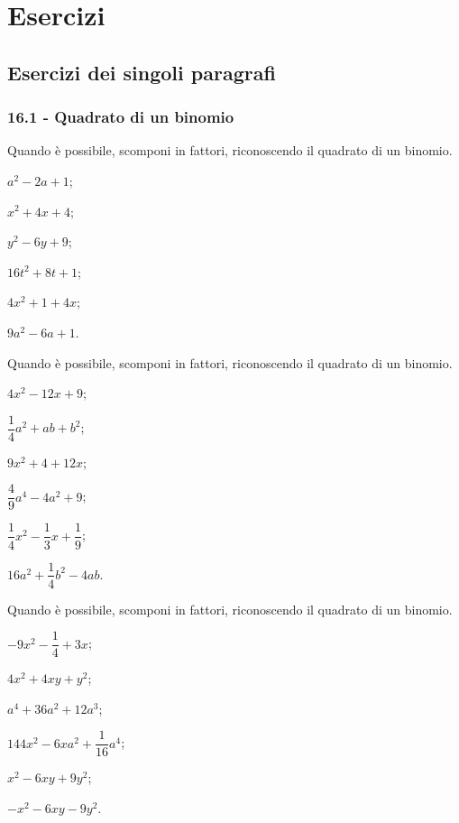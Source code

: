 \section{Esercizi}
\subsection{Esercizi dei singoli paragrafi}
\subsubsection*{16.1 - Quadrato di un binomio}
\begin{multicols}{2}
\begin{esercizio}
\label{ese:16.1}
Quando è possibile, scomponi in fattori, riconoscendo il quadrato di un binomio.
\begin{enumeratea}
 \item $a^{2}-2a+1$;
 \item $x^{2}+4x+4$;
 \item $y^{2}-6y+9$;
 \item $16t^{2}+8t+1$;
 \item $4x^{2}+1+4x$;
 \item $9a^{2}-6a+1$.
\end{enumeratea}
\end{esercizio}

\begin{esercizio}
\label{ese:16.2}
Quando è possibile, scomponi in fattori, riconoscendo il quadrato di un binomio.
\begin{enumeratea}
 \item $4x^{2}-12x+9$;
 \item $\dfrac{1}{4}a^{2}+ab+b^{2}$;
 \item $9x^{2}+4+12x$;
 \item $\dfrac{4}{9}a^{{4}}-4a^{2}+9$;
 \item $\dfrac{1}{4}x^{2}-\dfrac{1}{3}x+\dfrac{1}{9}$;
 \item $16a^{2}+\dfrac{1}{4}b^{2}-4ab$.
\end{enumeratea}
\end{esercizio}

\begin{esercizio}
\label{ese:16.3}
Quando è possibile, scomponi in fattori, riconoscendo il quadrato di un binomio.
\begin{enumeratea}
 \item $-9x^{2}-\dfrac{1}{4}+3x$;
 \item $4x^{2}+4xy+y^{2}$;
 \item $a^{4}+36a^{2}+12a^{3}$;
 \item $144x^{2}-6xa^{2}+\dfrac{1}{16}a^{4}$;
 \item $x^{2}-6xy+9y^{2}$;
 \item $-x^{2}-6xy-9y^{2}$.
\end{enumeratea}
\end{esercizio}


\end{multicols}
